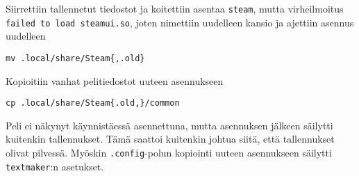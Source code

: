 \documentclass[main.tex]{subfiles}
\begin{document}
Siirrettiin tallennetut tiedostot ja koitettiin asentaa \texttt{steam}, mutta virheilmoitus \texttt{failed to load steamui.so}, joten nimettiin uudelleen kansio ja ajettiin asennus uudelleen

\begin{lstlisting}
mv .local/share/Steam{,.old} 
\end{lstlisting}

Kopioitiin vanhat pelitiedostot uuteen asennukseen

\begin{lstlisting}
cp .local/share/Steam{.old,}/common 
\end{lstlisting}

Peli ei näkynyt käynnistäessä asennettuna, mutta asennuksen jälkeen säilytti kuitenkin tallennukset. Tämä saattoi kuitenkin johtua siitä, että tallennukset olivat pilvessä. Myöskin \texttt{.config}-polun kopiointi uuteen asennukseen säilytti \texttt{textmaker}:n asetukset.
\end{document}
